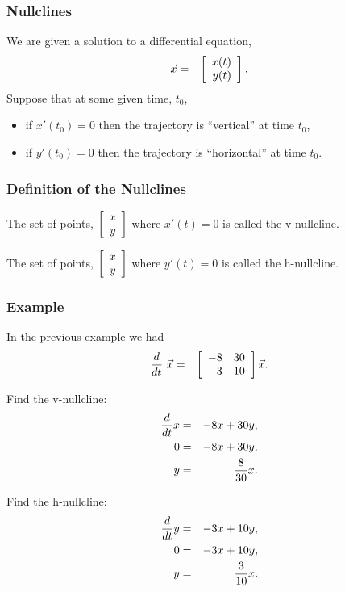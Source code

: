 \begin{frame}
  \frametitle{Nullclines}

  We are given a solution to a differential equation,
  \begin{eqnarray*}
    \vec{x} & = & \vecTwo{x(t)}{y(t)}.
  \end{eqnarray*}
  Suppose that at some given time, $t_0$, 
  \begin{itemize}
  \item if $x'(t_0)=0$ then the trajectory is ``vertical'' at time $t_0$,
  \item if $y'(t_0)=0$ then the trajectory is ``horizontal'' at time $t_0$.
  \end{itemize}

\end{frame}


\begin{frame}
  \frametitle{Definition of the Nullclines}

  \begin{definition}
    The set of points, $\vecTwo{x}{y}$ where $x'(t)=0$ is called the
    v-nullcline. 
  \end{definition}


  \begin{definition}
    The set of points, $\vecTwo{x}{y}$ where $y'(t)=0$ is called the
    h-nullcline.
  \end{definition}


\end{frame}


\begin{frame}
  \frametitle{Example}
  
  In the previous example we had
  \begin{eqnarray*}
    \deriv{~}{t} \vec{x} & = & \arrayTwo{-8}{30}{-3}{10} \vec{x}.
  \end{eqnarray*}

  {
    Find the v-nullcline:
    \begin{eqnarray*}
      \deriv{x}{t} & = & -8x + 30y, \\
      0 & = & -8x + 30y, \\
      y & = & \frac{8}{30} x.
    \end{eqnarray*}
  }

  {
    Find the h-nullcline:
    \begin{eqnarray*}
      \deriv{y}{t} & = & -3x + 10y, \\
      0 & = & -3x + 10y, \\
      y & = &  \frac{3}{10} x.
    \end{eqnarray*}
  }


\end{frame}


